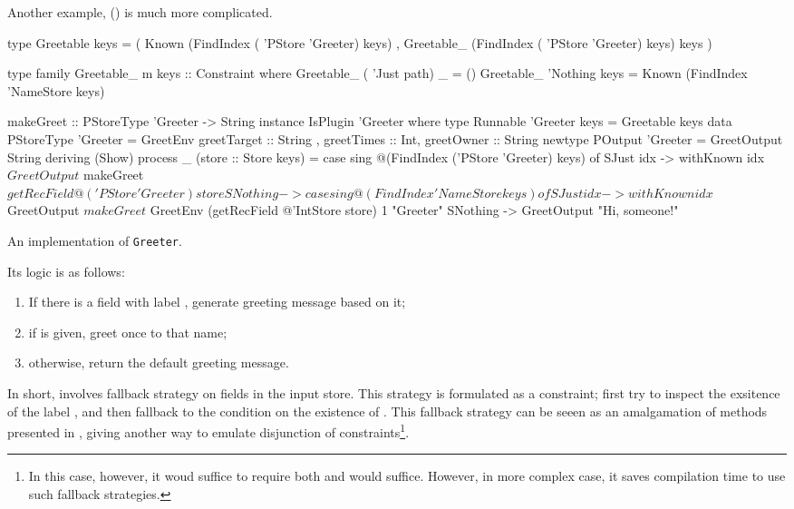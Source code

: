 \documentclass[demotion-paper.tex]{subfiles}
\begin{document}
Another example,  () is much more complicated.
\begin{listing}
\begin{code}
type Greetable keys =
  ( Known (FindIndex ( 'PStore 'Greeter) keys)
  , Greetable_ 
    (FindIndex ( 'PStore 'Greeter) keys) keys
  )

type family Greetable_ m keys :: Constraint where
  Greetable_ ( 'Just path) _ = ()
  Greetable_ 'Nothing keys = 
    Known (FindIndex 'NameStore keys)

makeGreet :: PStoreType 'Greeter -> String
instance IsPlugin 'Greeter where
  type Runnable 'Greeter keys = Greetable keys
  data PStoreType 'Greeter = GreetEnv
    { greetTarget :: String
    , greetTimes :: Int, greetOwner :: String }
  newtype POutput 'Greeter = 
    GreetOutput String deriving (Show)
  process _ (store :: Store keys) =
    case sing
        @(FindIndex ('PStore 'Greeter) keys) of
     SJust idx -> withKnown idx $ GreetOutput $
       makeGreet $ getRecField 
         @('PStore 'Greeter) store
     SNothing ->
      case sing @(FindIndex 'NameStore keys) of
       SJust idx -> withKnown idx $ GreetOutput $
         makeGreet $ GreetEnv
          (getRecField @'IntStore store)
          1 "Greeter"
       SNothing -> GreetOutput "Hi, someone!"
\end{code}
\caption{An implementation of \texttt{Greeter}.}
\label{lst:plugin-greet}
\end{listing}
Its logic is as follows:
\begin{enumerate}
  \item If there is a field with label , generate greeting message based on it;
  \item if  is given, greet once to that name;
  \item otherwise, return the default greeting message.
\end{enumerate}
In short,  involves fallback strategy on fields in the input store.
This strategy is formulated as a  constraint; first try to inspect the exsitence of the label , and then fallback to the condition on the existence of .
This fallback strategy can be seeen as an amalgamation of methods presented in , giving another way to emulate disjunction of constraints\footnote{%
In this case, however, it woud suffice to require both  and  would suffice. However, in more complex case, it saves compilation time to use such fallback strategies.}.
\end{document}

